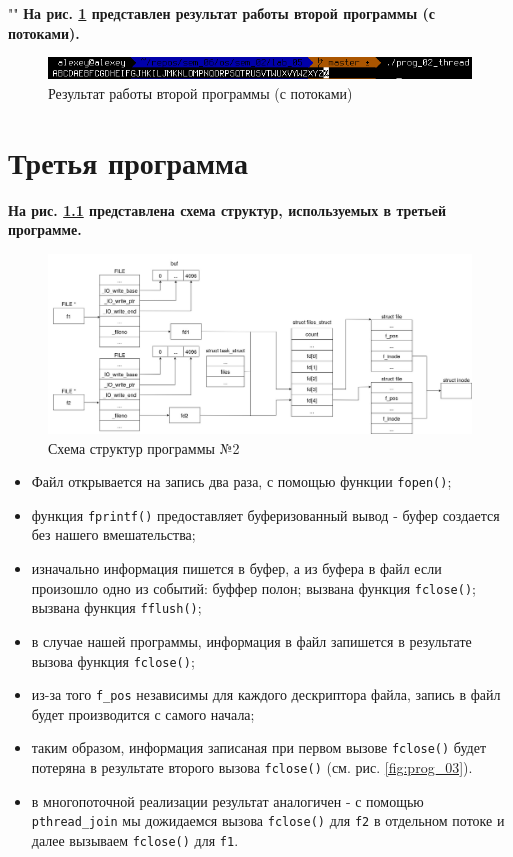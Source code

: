 \documentclass[12pt]{report}
\begin{document}
""\newline
\textbf{На рис. \ref{fig:prog_02_thread} представлен результат работы второй программы (с потоками).}

\begin{figure}[H]
	\centering
	\includegraphics[scale=0.8]{img/prog_02_thread.png}
	\caption{Результат работы второй программы (с потоками)}
	\label{fig:prog_02_thread}
\end{figure}

\chapter{Третья программа}

\textbf{На рис. \ref{fig:prog_03_schema} представлена схема структур, используемых в третьей программе.}

\begin{figure}[H]
	\centering
	\includegraphics[scale=0.32]{img/prog_03_schema.jpg}
	\caption{Схема структур программы №2}
	\label{fig:prog_03_schema}
\end{figure}

\begin{itemize}
	\item Файл открывается на запись два раза, с помощью функции \texttt{fopen()};
	\item функция \texttt{fprintf()} предоставляет буферизованный вывод - буфер создается без нашего вмешательства;
	\item изначально информация пишется в буфер, а из буфера в файл если произошло одно из событий:
		\subitem буффер полон;
		\subitem вызвана функция \texttt{fclose()};
		\subitem вызвана функция \texttt{fflush()};
	\item в случае нашей программы, информация в файл запишется в результате вызова функция \texttt{fclose()};
	\item из-за того \texttt{f\_pos} независимы для каждого дескриптора файла, запись в файл будет производится с самого начала;
	\item таким образом, информация записаная при первом вызове \texttt{fclose()} будет потеряна в результате второго вызова \texttt{fclose()} (см. рис. \ref{fig:prog_03}).
	\item в многопоточной реализации результат аналогичен - с помощью \texttt{pthread\_join} мы дожидаемся вызова \texttt{fclose()} для \texttt{f2} в отдельном потоке и далее вызываем \texttt{fclose()} для \texttt{f1}.
\end{itemize}
\end{document}
